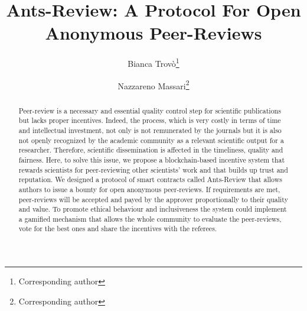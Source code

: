 \documentclass[runningheads]{llncs}
\begin{document}
%
\title{Ants-Review: A Protocol For Open Anonymous Peer-Reviews}
%
%
\author{Bianca Trovò\thanks{Corresponding author}\and
Nazzareno Massari\thanks{Corresponding author}}
%
%
%
\maketitle              %
%
\begin{abstract}
Peer-review is a necessary and essential quality control step for scientific publications but lacks proper  incentives. Indeed, the process, which is very costly in terms of time and intellectual investment, not only is not remunerated by the journals but it is also not openly recognized by the academic community as a relevant scientific output for a researcher. Therefore, scientific dissemination is affected in the timeliness, quality and fairness. Here, to solve this issue, we propose a blockchain-based incentive system that rewards scientists for peer-reviewing other scientists’ work and that builds up trust and reputation. We designed a protocol of smart contracts called Ants-Review that allows authors to issue a bounty for open anonymous peer-reviews. If requirements are met, peer-reviews will be accepted and payed by the approver proportionally to their quality and value. To promote ethical behaviour and inclusiveness the system could implement a gamified mechanism that allows the whole community to evaluate the peer-reviews, vote for the best ones and share the incentives with the referees.
\end{abstract}
%
%
\end{document}
